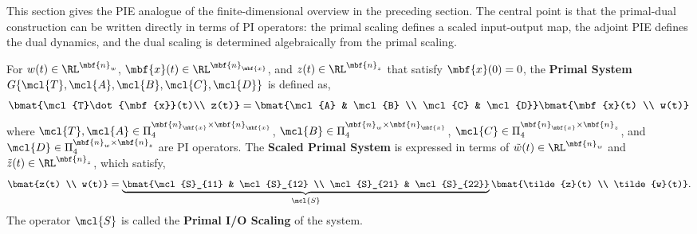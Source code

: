 This section gives the PIE analogue of the finite-dimensional overview in the preceding
section. The central point is that the primal-dual construction can be written directly
in terms of PI operators: the primal scaling defines a scaled input-output map, the
adjoint PIE defines the dual dynamics, and the dual scaling is determined algebraically
from the primal scaling.

\begin{definition}\label{def:primalscaledsys}
    For $w(t)\in\RL^{\mbf{n}_w}$, $\mbf{x}(t)\in\RL^{\mbf{n}_\mbf{x}}$, and
    $z(t)\in\RL^{\mbf{n}_z}$ that satisfy $\mbf{x}(0) = 0$, the \textbf{Primal System}
    $G\{\mcl{T}, \mcl{A}, \mcl{B}, \mcl{C}, \mcl{D}\}$ is defined as,
    \begin{equation}\label{eqn:primalsys}
        \bmat{\mcl{T}\dot{\mbf{x}}(t)\\ z(t)} = \bmat{\mcl{A} & \mcl{B} \\
        \mcl{C} & \mcl{D}}\bmat{\mbf{x}(t) \\ w(t)}
    \end{equation}
    where $\mcl{T}, \mcl{A}\in \Pi_4^{\mbf{n}_\mbf{x} \times \mbf{n}_\mbf{x}}$,
    $\mcl{B}\in\Pi_4^{\mbf{n}_w \times \mbf{n}_\mbf{x}}$,
    $\mcl{C}\in\Pi_4^{\mbf{n}_\mbf{x}\times\mbf{n}_z}$, and
    $\mcl{D}\in\Pi_4^{\mbf{n}_w \times \mbf{n}_z}$ are PI operators.
    The \textbf{Scaled Primal System} is expressed in terms of $\tilde{w}(t)\in
    \RL^{\mbf{n}_w}$ and $\tilde{z}(t)\in\RL^{\mbf{n}_z}$, which satisfy,
    \begin{equation}\label{eqn:primalscaling}
        \bmat{z(t) \\ w(t)} = \underbrace{\bmat{\mcl{S}_{11} & \mcl{S}_{12} \\
        \mcl{S}_{21} & \mcl{S}_{22}}}_{\mcl{S}}\bmat{\tilde{z}(t) \\ \tilde{w}(t)}.
    \end{equation}
    The operator $\mcl{S}$ is called the \textbf{Primal I/O Scaling} of the system.
\end{definition}


